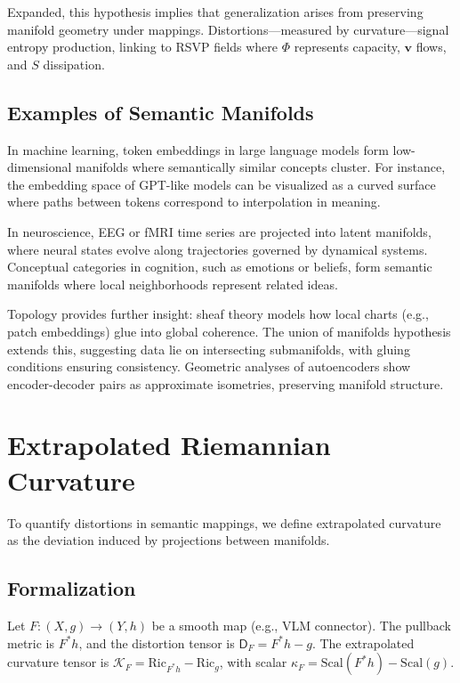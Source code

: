 \documentclass{article}
\theoremstyle{definition}
\begin{document}
Expanded, this hypothesis implies that generalization arises from preserving manifold geometry under mappings. Distortions—measured by curvature—signal entropy production, linking to RSVP fields where $\Phi$ represents capacity, $\mathbf{v}$ flows, and $S$ dissipation.

\subsection{Examples of Semantic Manifolds}

In machine learning, token embeddings in large language models form low-dimensional manifolds where semantically similar concepts cluster. For instance, the embedding space of GPT-like models can be visualized as a curved surface where paths between tokens correspond to interpolation in meaning.

In neuroscience, EEG or fMRI time series are projected into latent manifolds, where neural states evolve along trajectories governed by dynamical systems. Conceptual categories in cognition, such as emotions or beliefs, form semantic manifolds where local neighborhoods represent related ideas.

Topology provides further insight: sheaf theory models how local charts (e.g., patch embeddings) glue into global coherence. The union of manifolds hypothesis \cite{brown2023union} extends this, suggesting data lie on intersecting submanifolds, with gluing conditions ensuring consistency. Geometric analyses of autoencoders \cite{lee2023geometric} show encoder-decoder pairs as approximate isometries, preserving manifold structure.

\section{Extrapolated Riemannian Curvature}

To quantify distortions in semantic mappings, we define extrapolated curvature as the deviation induced by projections between manifolds.

\subsection{Formalization}

Let $F: (X, g) \to (Y, h)$ be a smooth map (e.g., VLM connector). The pullback metric is $F^* h$, and the distortion tensor is $\mathsf{D}_F = F^* h - g$. The extrapolated curvature tensor is $\mathcal{K}_F = \mathrm{Ric}_{F^* h} - \mathrm{Ric}_g$, with scalar $\kappa_F = \mathrm{Scal}(F^* h) - \mathrm{Scal}(g)$.
\end{document}
